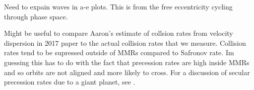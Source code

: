 \documentclass[twocolumn]{aastex62}
\begin{document}
Need to expain waves in a-e plots. This is from the free eccentricity cycling through phase space.

Might be useful to compare Aaron's estimate of collsion rates from velocity dispersion in 2017 paper to the actual collision rates that we measure. Collision rates tend to be supressed outside of MMRs compared to Safronov rate. Im guessing this has to do with the fact that precession rates are high inside MMRs and so orbits are not aligned and more likely to cross. For a discussion of secular precession rates due to a giant planet, see \citet{2009MNRAS.399.1403M}.



\clearpage
\end{document}
